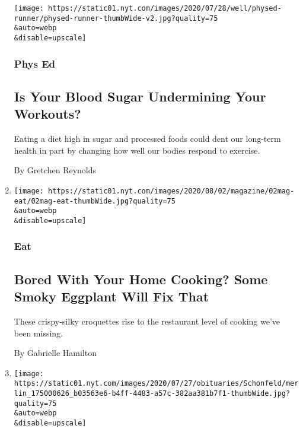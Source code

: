 \begin{enumerate}
  \texttt{[image: https://static01.nyt.com/images/2020/07/28/well/physed-runner/physed-runner-thumbWide-v2.jpg?quality=75\\\&auto=webp\\\&disable=upscale]}

  \hypertarget{phys-ed}{%
  \subsubsection{Phys Ed}\label{phys-ed}}

  \hypertarget{is-your-blood-sugar-undermining-your-workouts}{%
  \subsection{Is Your Blood Sugar Undermining Your
  Workouts?}\label{is-your-blood-sugar-undermining-your-workouts}}

  Eating a diet high in sugar and processed foods could dent our
  long-term health in part by changing how well our bodies respond to
  exercise.

  By Gretchen Reynolds
\item
  \href{/2020/07/29/magazine/bored-with-your-home-cooking-some-smoky-eggplant-will-fix-that.html}{}

  \texttt{[image: https://static01.nyt.com/images/2020/08/02/magazine/02mag-eat/02mag-eat-thumbWide.jpg?quality=75\\\&auto=webp\\\&disable=upscale]}

  \hypertarget{eat-}{%
  \subsubsection{Eat }\label{eat-}}

  \hypertarget{bored-with-your-home-cooking-some-smoky-eggplant-will-fix-that}{%
  \subsection{Bored With Your Home Cooking? Some Smoky Eggplant Will Fix
  That}\label{bored-with-your-home-cooking-some-smoky-eggplant-will-fix-that}}

  These crispy-silky croquettes rise to the restaurant level of cooking
  we've been missing.

  By Gabrielle Hamilton
\item
  \href{/2020/07/28/business/media/reese-schonfeld-a-founder-of-cnn-and-food-network-dies-at-88.html}{}

  \texttt{[image: https://static01.nyt.com/images/2020/07/27/obituaries/Schonfeld/merlin\_175000626\_b03563e6-b4ff-4483-a57c-382aa381b7f1-thumbWide.jpg?quality=75\\\&auto=webp\\\&disable=upscale]}


\end{enumerate}
